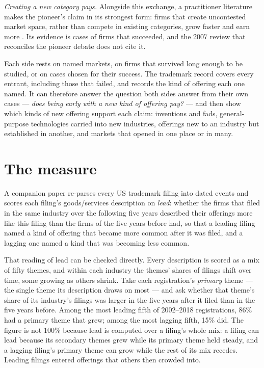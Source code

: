 \emph{Creating a new category pays.} Alongside this exchange, a
practitioner literature makes the pioneer's claim in its strongest
form: firms that create uncontested market space, rather than compete
in existing categories, grow faster and earn more
\citep{KimMauborgne2004}. Its evidence is cases of firms that
succeeded, and the 2007 review that reconciles the pioneer debate does
not cite it.

Each side rests on named markets, on firms that survived long enough to
be studied, or on cases chosen for their success. The trademark record
covers every entrant, including those that failed, and records the kind
of offering each one named. It can therefore answer the question both
sides answer from their own cases --- \emph{does being early with a new
kind of offering pay?} --- and then show which kinds of new offering
support each claim: inventions and fads, general-purpose technologies
carried into new industries, offerings new to an industry but
established in another, and markets that opened in one place or in
many.

\section*{The measure}

A companion paper \citep{SilverCorpus2026} re-parses every US trademark
filing into dated events and scores each filing's goods/services
description on \emph{lead}: whether the firms that filed in the same
industry over the following five years described their offerings more
like this filing than the firms of the five years before had, so that
a leading filing named a kind of offering that became more common after
it was filed, and a lagging one named a kind that was becoming less
common.

That reading of lead can be checked directly. Every description is
scored as a mix of fifty themes, and within each industry the themes'
shares of filings shift over time, some growing as others shrink. Take
each registration's \emph{primary} theme --- the single theme its
description draws on most --- and ask whether that theme's share of its
industry's filings was larger in the five years after it filed than in
the five years before. Among the most leading fifth of 2002--2018
registrations, 86\% had a primary theme that grew; among the most
lagging fifth, 15\% did. The figure is not 100\% because lead is
computed over a filing's whole mix: a filing can lead because its
secondary themes grew while its primary theme held steady, and a
lagging filing's primary theme can grow while the rest of its mix
recedes. Leading filings entered offerings that others then crowded
into.

